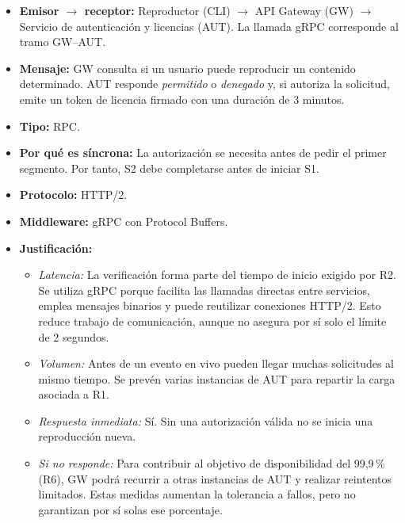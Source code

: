 \begin{itemize}
    \item \textbf{Emisor $\rightarrow$ receptor:}
    Reproductor (CLI) $\rightarrow$ API Gateway (GW) $\rightarrow$ Servicio de autenticación y licencias (AUT). La llamada gRPC corresponde al tramo GW--AUT.

    \item \textbf{Mensaje:}
    GW consulta si un usuario puede reproducir un contenido determinado. AUT responde \emph{permitido} o \emph{denegado} y, si autoriza la solicitud, emite un token de licencia firmado con una duración de 3 minutos.

    \item \textbf{Tipo:} RPC.

    \item \textbf{Por qué es síncrona:}
    La autorización se necesita antes de pedir el primer segmento. Por tanto, S2 debe completarse antes de iniciar S1.

    \item \textbf{Protocolo:} HTTP/2.

    \item \textbf{Middleware:} gRPC con Protocol Buffers.

    \item \textbf{Justificación:}
    \begin{itemize}
        \item \textit{Latencia:}
        La verificación forma parte del tiempo de inicio exigido por R2. Se utiliza gRPC porque facilita las llamadas directas entre servicios, emplea mensajes binarios y puede reutilizar conexiones HTTP/2. Esto reduce trabajo de comunicación, aunque no asegura por sí solo el límite de 2 segundos.

        \item \textit{Volumen:}
        Antes de un evento en vivo pueden llegar muchas solicitudes al mismo tiempo. Se prevén varias instancias de AUT para repartir la carga asociada a R1.

        \item \textit{Respuesta inmediata:}
        Sí. Sin una autorización válida no se inicia una reproducción nueva.

        \item \textit{Si no responde:}
        Para contribuir al objetivo de disponibilidad del 99,9\,\% (R6), GW podrá recurrir a otras instancias de AUT y realizar reintentos limitados. Estas medidas aumentan la tolerancia a fallos, pero no garantizan por sí solas ese porcentaje.


\end{itemize}
\end{itemize}
